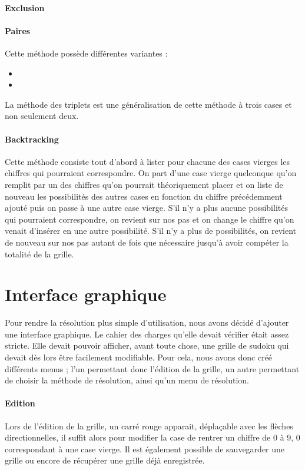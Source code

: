 \documentclass[12pt,a4paper]{report}
\begin{document}
\paragraph{Exclusion}
\paragraph{Paires} Cette méthode possède différentes variantes :
\begin{itemize}[label=--]
\item 
\item
\end{itemize} 
La méthode des triplets est une généralisation de cette méthode à trois cases et non seulement deux.
\paragraph{Backtracking} Cette méthode consiste tout d'abord à lister pour chacune des cases vierges les chiffres qui pourraient correspondre. On part d'une case vierge quelconque qu'on remplit par un des chiffres qu'on pourrait théoriquement placer et on liste de nouveau les possibilités des autres cases en fonction du chiffre précédemment ajouté puis on passe à une autre case vierge. S'il n'y a plus aucune possibilités qui pourraient correspondre, on revient sur nos pas et on change le chiffre qu'on venait d'insérer en une autre possibilité. S'il n'y a plus de possibilités, on revient de nouveau sur nos pas autant de fois que nécessaire jusqu'à avoir compéter la totalité de la grille.

\section{Interface graphique}
Pour rendre la résolution plus simple d'utilisation, nous avons décidé d'ajouter une interface graphique. Le cahier des charges qu'elle devait vérifier était assez stricte. Elle devait pouvoir afficher, avant toute chose, une grille de sudoku qui devait dès lors être facilement modifiable. Pour cela, nous avons donc créé différents menus ; l'un permettant donc l'édition de la grille, un autre permettant de choisir la méthode de résolution, ainsi qu'un menu de résolution. 

\paragraph{Edition}Lors de l'édition de la grille, un carré rouge apparait, déplaçable avec les flèches directionnelles, il suffit alors pour modifier la case de rentrer un chiffre de 0 à 9, 0 correspondant à une case vierge. Il est également possible de sauvegarder une grille ou encore de récupérer une grille déjà enregistrée.
\end{document}
